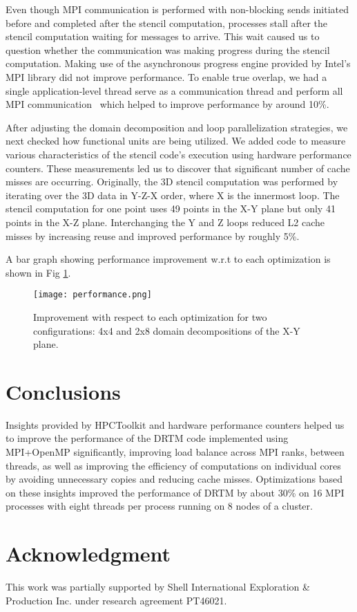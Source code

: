 \documentclass[conference]{IEEEtran}
\begin{document}
Even though MPI communication is performed with non-blocking sends initiated before and completed after the stencil computation, processes stall after the stencil computation waiting for messages to arrive. This wait caused us to question whether the communication was making progress during the stencil computation. Making use of the asynchronous progress engine provided by Intel's MPI library did not improve performance. To enable true overlap, we had a single application-level thread serve as a communication thread and perform all MPI communication~\cite{bamboo,asyncmpi} which helped to improve performance by around 10\%.

After adjusting the domain decomposition and loop parallelization strategies, we next checked how functional units are being utilized. We added code to measure various characteristics of the stencil code's execution using hardware performance counters. These measurements led us to discover that significant number of cache misses are occurring. Originally, the 3D stencil computation was performed by iterating over the 3D data in Y-Z-X order, where X is the innermost loop. The stencil computation for one point uses 49 points in the X-Y plane but only 41 points in the X-Z plane. Interchanging the Y and Z loops reduced L2 cache misses by increasing reuse and improved performance by roughly 5\%.

A bar graph showing performance improvement w.r.t to each optimization is shown in Fig \ref{fig:performance}.

\begin{figure}[t]
    \centering
    \texttt{[image: performance.png]}
    \caption{Improvement with respect to each optimization for two configurations: 4x4 and 2x8 domain decompositions of the X-Y plane.}
    \label{fig:performance}
\end{figure}




















\section{Conclusions}

Insights provided by HPCToolkit and hardware performance counters helped us to improve the performance of the DRTM code implemented using MPI+OpenMP significantly, improving load balance across MPI ranks, between threads, as well as improving the efficiency of computations on individual cores by avoiding unnecessary copies and reducing cache misses. Optimizations based on these insights improved the performance of DRTM by about 30\% on 16 MPI processes with eight threads per process running on 8 nodes of a cluster.


\section*{Acknowledgment}
This work was partially supported by Shell International Exploration \& Production Inc. under research agreement PT46021.










\end{document}
